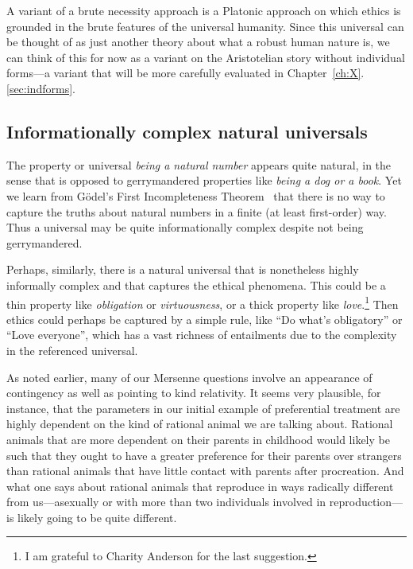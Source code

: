 A variant of a brute necessity approach is a Platonic approach on which ethics is grounded in the brute features
of the universal humanity. Since this universal can be thought of as just another theory about what a robust human
nature is, we can think of this for now as a variant on the Aristotelian story without individual forms---a variant 
that will be more carefully evaluated in Chapter~\ref{ch:X}.\ref{sec:indforms}.

\subsection{Informationally complex natural universals}\label{sec:complex-universals}
The property or universal \textit{being a natural number} appears quite natural, in the  
sense that is opposed to gerrymandered properties like \textit{being a dog or a book}. Yet we learn from
G\"odel's First Incompleteness Theorem~\parencite[Thm.~15.6]{BoolosJeffrey1995} that there is no way to
capture the truths about natural numbers in a finite (at least first-order) way. Thus a universal
may be quite informationally complex despite not being gerrymandered.

Perhaps, similarly, there is a natural universal that is nonetheless highly informally complex and that
captures the ethical phenomena. This could be a thin property like \textit{obligation} or \textit{virtuousness},
or a thick property like \textit{love}.\footnote{I am grateful to Charity Anderson for the last suggestion.}
Then ethics could perhaps be captured by a simple rule, like ``Do what's obligatory'' or ``Love
everyone'', which has a vast richness of entailments due to the complexity in the referenced universal.

As noted earlier, many of our Mersenne questions involve an appearance of contingency as well as pointing
to kind relativity. It seems very plausible, for instance, that the parameters in our initial example of preferential treatment are highly dependent on the kind of rational animal we are talking about. Rational animals that are more
dependent on their parents in childhood would likely be such that they ought to have a greater preference for
their parents over strangers than rational animals that have little contact with parents after procreation.
And what one says about rational animals that reproduce in ways radically different from us---asexually or 
with more than two individuals involved in reproduction---is likely going to be quite different. 

